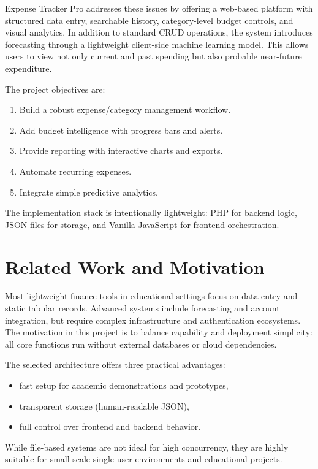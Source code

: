 \documentclass[conference]{IEEEtran}
\begin{document}
Expense Tracker Pro addresses these issues by offering a web-based platform with structured data entry, searchable history, category-level budget controls, and visual analytics. In addition to standard CRUD operations, the system introduces forecasting through a lightweight client-side machine learning model. This allows users to view not only current and past spending but also probable near-future expenditure.

The project objectives are:
\begin{enumerate}
    \item Build a robust expense/category management workflow.
    \item Add budget intelligence with progress bars and alerts.
    \item Provide reporting with interactive charts and exports.
    \item Automate recurring expenses.
    \item Integrate simple predictive analytics.
\end{enumerate}

The implementation stack is intentionally lightweight: PHP for backend logic, JSON files for storage, and Vanilla JavaScript for frontend orchestration.

\section{Related Work and Motivation}
Most lightweight finance tools in educational settings focus on data entry and static tabular records. Advanced systems include forecasting and account integration, but require complex infrastructure and authentication ecosystems. The motivation in this project is to balance capability and deployment simplicity: all core functions run without external databases or cloud dependencies.

The selected architecture offers three practical advantages:
\begin{itemize}
    \item fast setup for academic demonstrations and prototypes,
    \item transparent storage (human-readable JSON),
    \item full control over frontend and backend behavior.
\end{itemize}

While file-based systems are not ideal for high concurrency, they are highly suitable for small-scale single-user environments and educational projects.
\end{document}
